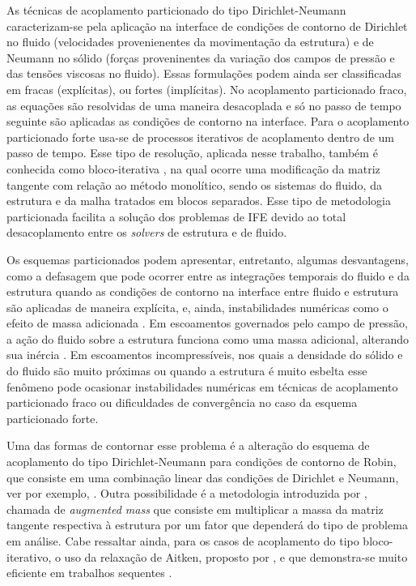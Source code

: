 \documentclass[tese_patricia.tex]{subfiles}
\begin{document}
As técnicas de acoplamento particionado do tipo Dirichlet-Neumann caracterizam-se pela aplicação na interface de condições de contorno de Dirichlet no fluido (velocidades provenienentes da movimentação da estrutura) e de Neumann no sólido (forças proveninentes da variação dos campos de pressão e das tensões viscosas no fluido). Essas formulações podem ainda ser classificadas em fracas (explícitas), ou fortes (implícitas). No acoplamento particionado fraco, as equações são resolvidas de uma maneira desacoplada e só no passo de tempo seguinte são aplicadas as condições de contorno na interface. Para o acoplamento particionado forte usa-se de processos iterativos de acoplamento dentro de um passo de tempo. Esse tipo de resolução, aplicada nesse trabalho, também é conhecida como bloco-iterativa \cite{BazilevsTT:2013}, na qual ocorre uma modificação da matriz tangente com relação ao método monolítico, sendo os sistemas do fluido, da estrutura e da malha tratados em blocos separados. Esse tipo de metodologia particionada facilita a solução dos problemas de IFE devido ao total desacoplamento entre os \textit{solvers} de estrutura e de fluido.

Os esquemas particionados podem apresentar, entretanto, algumas desvantagens, como a defasagem que pode ocorrer entre as integrações temporais do fluido e da estrutura quando as condições de contorno na interface entre fluido e estrutura são aplicadas de maneira explícita, e, ainda, instabilidades numéricas como o efeito de massa adicionada \cite{FelippaPF:2001}. Em escoamentos governados pelo campo de pressão, a ação do fluido sobre a estrutura funciona como uma massa adicional, alterando sua inércia \cite{TallecM:2001}. Em escoamentos incompressíveis, nos quais a densidade do sólido e do fluido são muito próximas ou quando a estrutura é muito esbelta esse fenômeno pode ocasionar instabilidades numéricas em técnicas de acoplamento particionado fraco ou dificuldades de convergência no caso da esquema particionado forte. 

Uma das formas de contornar esse problema é a alteração do esquema de acoplamento do tipo Dirichlet-Neumann para condições de contorno de Robin, que consiste em uma combinação linear das condições de Dirichlet e Neumann, ver por exemplo, . Outra possibilidade é a metodologia introduzida por , chamada de \textit{augmented mass} que consiste em multiplicar a massa da matriz tangente respectiva à estrutura por um fator que dependerá do tipo de problema em análise. Cabe ressaltar ainda, para os casos de acoplamento do tipo bloco-iterativo, o uso da relaxação de Aitken, proposto por , e que demonstra-se muito eficiente em trabalhos sequentes \cite{KuttlerW:2008,FernandesCS:2019}.
\end{document}
